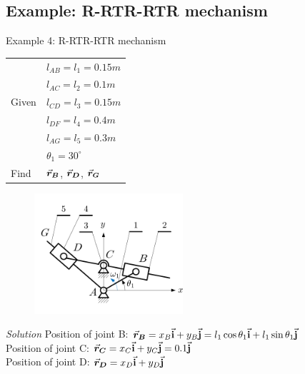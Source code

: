 \subsection{Example: R-RTR-RTR mechanism}

\begin{frame}
	\begin{block}{Example 4: R-RTR-RTR mechanism}
		\begin{table}
			\begin{minipage}{0.5\linewidth}
				\begin{tabular}{l|l}
					& $l_{AB}=l_1=0.15m$\\
					& $l_{AC}=l_2=0.1m$\\
					Given & $l_{CD}=l_3=0.15m$\\
					& $l_{DF}=l_4=0.4m$\\
					& $l_{AG}=l_5=0.3m$\\
					& $\theta_1=30^{\circ}$\\ \hline
					Find & $\vec{\bm{r}}_{\bm{B}}$, $\vec{\bm{r}}_{\bm{D}}$, $\vec{\bm{r}}_{\bm{G}}$
				\end{tabular}
			\end{minipage}\hfill
			\begin{minipage}{0.5\linewidth}
				\begin{figure}
					\includegraphics[width=55mm]{images/R-RTR-RTR.png}
				\end{figure}
			\end{minipage}
		\end{table}	
	\end{block}
\emph{Solution}\vskip2.5mm
Position of joint B:  $\displaystyle \vec{\bm{r}}_{\bm{B}} = x_B\vec{\mathbf{i}} + y_B\vec{\mathbf{j}} = l_1\cos{\theta_1}\vec{\mathbf{i}} + l_1\sin{\theta_1}\vec{\mathbf{j}}$\\
Position of joint C:  $\displaystyle \vec{\bm{r}}_{\bm{C}} = x_C\vec{\mathbf{i}} + y_C\vec{\mathbf{j}} = 0.1\vec{\mathbf{j}}$\\
Position of joint D:  $\displaystyle \vec{\bm{r}}_{\bm{D}} = x_D\vec{\mathbf{i}} + y_D\vec{\mathbf{j}}$\\
\end{frame}

